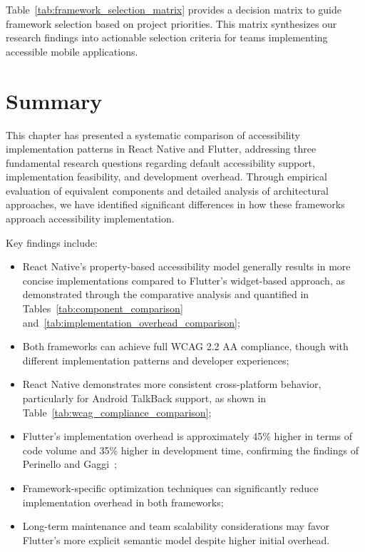 Table~\ref{tab:framework_selection_matrix} provides a decision matrix to guide framework selection based on project priorities. This matrix synthesizes our research findings into actionable selection criteria for teams implementing accessible mobile applications.

\section{Summary}
\label{sec:summary}

This chapter has presented a systematic comparison of accessibility implementation patterns in React Native and Flutter, addressing three fundamental research questions regarding default accessibility support, implementation feasibility, and development overhead. Through empirical evaluation of equivalent components and detailed analysis of architectural approaches, we have identified significant differences in how these frameworks approach accessibility implementation.

Key findings include:

\begin{itemize}
    \item React Native's property-based accessibility model generally results in more concise implementations compared to Flutter's widget-based approach, as demonstrated through the comparative analysis and quantified in Tables~\ref{tab:component_comparison} and~\ref{tab:implementation_overhead_comparison};
    
    \item Both frameworks can achieve full WCAG 2.2 AA compliance, though with different implementation patterns and developer experiences;
    
    \item React Native demonstrates more consistent cross-platform behavior, particularly for Android TalkBack support, as shown in Table~\ref{tab:wcag_compliance_comparison};
    
    \item Flutter's implementation overhead is approximately 45\% higher in terms of code volume and 35\% higher in development time, confirming the findings of Perinello and Gaggi~\cite{perinello2024accessibility};
    
    \item Framework-specific optimization techniques can significantly reduce implementation overhead in both frameworks;
    
    \item Long-term maintenance and team scalability considerations may favor Flutter's more explicit semantic model despite higher initial overhead.
\end{itemize}

